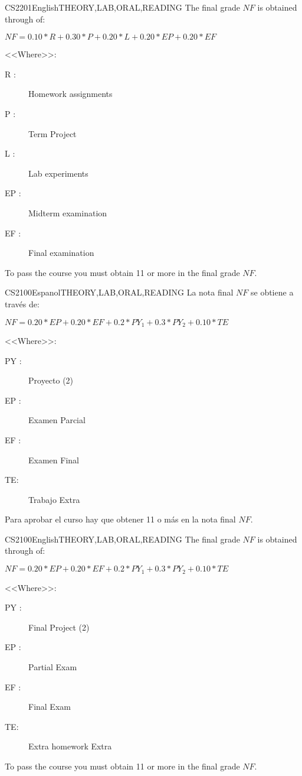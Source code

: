 \begin{evaluation}{CS2201}{English}{THEORY,LAB,ORAL,READING}
The final grade $NF$ is obtained through of:

$ NF =  0.10*R + 0.30*P + 0.20*L + 0.20*EP + 0.20*EF $

\noindent <<Where>>:
\begin{description}
  \item[R :] Homework assignments
  \item[P :] Term Project
  \item[L :] Lab experiments
  \item[EP :] Midterm examination
  \item[EF :] Final examination
\end{description}

\noindent To pass the course you must obtain 11 or more in the final grade $NF$.
\end{evaluation}

\begin{evaluation}{CS2100}{Espanol}{THEORY,LAB,ORAL,READING}
La nota final $NF$ se obtiene a través de:

$ NF = 0.20*EP + 0.20*EF + 0.2*PY_{1} + 0.3*PY_{2} + 0.10*TE $

\noindent <<Where>>:
\begin{description}
  \item[PY :] Proyecto (2)
  \item[EP :] Examen Parcial
  \item[EF :] Examen Final
 \item[TE:] Trabajo Extra
\end{description}
\noindent Para aprobar el curso hay que obtener 11 o más en la nota final $NF$.
\end{evaluation}

\begin{evaluation}{CS2100}{English}{THEORY,LAB,ORAL,READING}
The final grade $NF$ is obtained through of:

$ NF = 0.20*EP + 0.20*EF + 0.2*PY_{1} + 0.3*PY_{2} + 0.10*TE $

\noindent <<Where>>:
\begin{description}
  \item[PY :] Final Project (2)
  \item[EP :] Partial Exam
  \item[EF :] Final Exam
 \item[TE:] Extra homework Extra
\end{description}
\noindent To pass the course you must obtain 11 or more in the final grade $NF$.
\end{evaluation}
 
